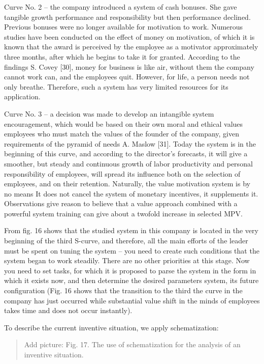 \documentclass[11pt,a4paper]{book}
\newcommand{\addpicture}[1]{
  \begin{quote} Add picture: #1\end{quote}
}
\begin{document}
Curve No. 2 -- the company introduced a system of cash bonuses. She gave
tangible growth performance and responsibility but then performance declined.
Previous bonuses were no longer available for motivation to work. Numerous
studies have been conducted on the effect of money on motivation, of which it
is known that the award is perceived by the employee as a motivator
approximately three months, after which he begins to take it for granted.
According to the findings S. Covey [30], money for business is like air,
without them the company cannot work can, and the employees quit. However, for
life, a person needs not only breathe. Therefore, such a system has very
limited resources for its application.

Curve No. 3 -- a decision was made to develop an intangible system
encouragement, which would be based on their own moral and ethical values
employees who must match the values of the founder of the company, given
requirements of the pyramid of needs A. Maslow [31]. Today the system is in
the beginning of this curve, and according to the director’s forecasts, it
will give a smoother, but steady and continuous growth of labor productivity
and personal responsibility of employees, will spread its influence both on
the selection of employees, and on their retention. Naturally, the value
motivation system is by no means It does not cancel the system of monetary
incentives, it supplements it. Observations give reason to believe that a
value approach combined with a powerful system training can give about a
twofold increase in selected MPV.

From fig. 16 shows that the studied system in this company is located in the
very beginning of the third S-curve, and therefore, all the main efforts of
the leader must be spent on tuning the system -- you need to create such
conditions that the system began to work steadily. There are no other
priorities at this stage.  Now you need to set tasks, for which it is proposed
to parse the system in the form in which it exists now, and then determine the
desired parameters system, its future configuration (Fig. 16 shows that the
transition to the third the curve in the company has just occurred while
substantial value shift in the minds of employees takes time and does not
occur instantly).

To describe the current inventive situation, we apply schematization:

\addpicture{Fig. 17. The use of schematization for the analysis of an
  inventive situation.}
\end{document}
